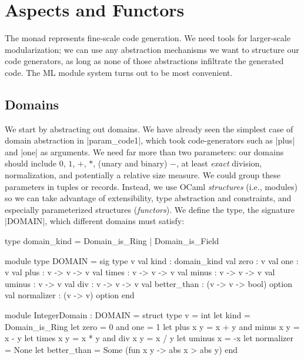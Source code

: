 \documentclass{elsart}
\begin{document}
\section{Aspects and Functors}\label{functors}

The monad represents fine-scale code generation. We need tools for
larger-scale modularization; we can use any abstraction
mechanisms we want to structure our code generators, as long as none
of those abstractions infiltrate the generated code. The ML module system
turns out to be most convenient.

\subsection{Domains}\label{sec:domains}

We start by abstracting out domains. We have already seen the simplest
case of domain abstraction in |param_code1|, which took
code-generators such as |plus| and |one| as arguments.  We need far
more than two parameters: our domains should include $0$, $1$, $+$,
$*$, (unary and binary) $-$, at least \emph{exact} division,
normalization, and potentially a relative size measure. We could group
these parameters in tuples or records.  Instead, we use OCaml
\emph{structures} (i.e., modules) so we can take advantage of
extensibility, type abstraction and constraints, and especially
parameterized structures (\emph{functors}).  We define the type,
the signature |DOMAIN|, which different domains must satisfy:

\begin{code}
type domain_kind = Domain_is_Ring | Domain_is_Field

module type DOMAIN = sig
  type v
  val kind : domain_kind
  val zero : v
  val one  : v
  val plus : v -> v -> v
  val times  : v -> v -> v
  val minus  : v -> v -> v
  val uminus : v -> v
  val div    : v -> v -> v
  val better_than : (v -> v -> bool) option
  val normalizer  : (v -> v) option
end 

module IntegerDomain : DOMAIN = struct
  type v = int
  let kind = Domain_is_Ring
  let zero = 0 and one = 1
  let plus x y = x + y  and  minus x y = x - y
  let times x y = x * y and  div x y = x / y
  let uminus x = -x
  let normalizer = None
  let better_than = Some (fun x y -> abs x > abs y)
end
\end{code}
\end{document}
